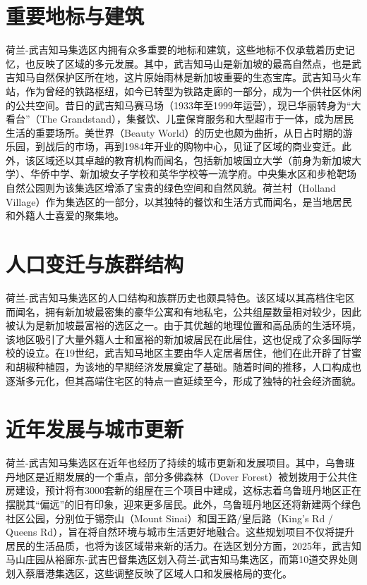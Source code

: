 \documentclass[11pt,a4paper,twoside,openany]{book}
\begin{document}
\section{重要地标与建筑}
荷兰-武吉知马集选区内拥有众多重要的地标和建筑，这些地标不仅承载着历史记忆，也反映了区域的多元发展。其中，武吉知马山是新加坡的最高自然点，也是武吉知马自然保护区所在地，这片原始雨林是新加坡重要的生态宝库。武吉知马火车站，作为曾经的铁路枢纽，如今已转型为铁路走廊的一部分，成为一个供社区休闲的公共空间。昔日的武吉知马赛马场（1933年至1999年运营），现已华丽转身为“大看台”（The Grandstand），集餐饮、儿童保育服务和大型超市于一体，成为居民生活的重要场所。美世界（Beauty World）的历史也颇为曲折，从日占时期的游乐园，到战后的市场，再到1984年开业的购物中心，见证了区域的商业变迁。此外，该区域还以其卓越的教育机构而闻名，包括新加坡国立大学（前身为新加坡大学）、华侨中学、新加坡女子学校和英华学校等一流学府。中央集水区和步枪靶场自然公园则为该集选区增添了宝贵的绿色空间和自然风貌。荷兰村（Holland Village）作为集选区的一部分，以其独特的餐饮和生活方式而闻名，是当地居民和外籍人士喜爱的聚集地。

\section{人口变迁与族群结构}
荷兰-武吉知马集选区的人口结构和族群历史也颇具特色。该区域以其高档住宅区而闻名，拥有新加坡最密集的豪华公寓和有地私宅，公共组屋数量相对较少，因此被认为是新加坡最富裕的选区之一。由于其优越的地理位置和高品质的生活环境，该地区吸引了大量外籍人士和富裕的新加坡居民在此居住，这也促成了众多国际学校的设立。在19世纪，武吉知马地区主要由华人定居者居住，他们在此开辟了甘蜜和胡椒种植园，为该地的早期经济发展奠定了基础。随着时间的推移，人口构成也逐渐多元化，但其高端住宅区的特点一直延续至今，形成了独特的社会经济面貌。

\section{近年发展与城市更新}
荷兰-武吉知马集选区在近年也经历了持续的城市更新和发展项目。其中，乌鲁班丹地区是近期发展的一个重点，部分多佛森林（Dover Forest）被划拨用于公共住房建设，预计将有3000套新的组屋在三个项目中建成，这标志着乌鲁班丹地区正在摆脱其“偏远”的旧有印象，迎来更多居民。此外，乌鲁班丹地区还将新建两个绿色社区公园，分别位于锡奈山（Mount Sinai）和国王路/皇后路（King's Rd / Queens Rd），旨在将自然环境与城市生活更好地融合。这些规划项目不仅将提升居民的生活品质，也将为该区域带来新的活力。在选区划分方面，2025年，武吉知马山庄园从裕廊东-武吉巴督集选区划入荷兰-武吉知马集选区，而第10道交界处则划入蔡厝港集选区，这些调整反映了区域人口和发展格局的变化。
\end{document}
